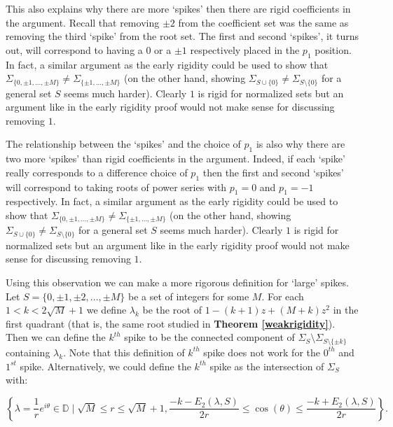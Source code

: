 \documentclass[11pt]{amsart}
\numberwithin{theorem}{section} %
\numberwithin{corollary}{section}
\numberwithin{lemma}{section}
\numberwithin{proposition}{section}
\numberwithin{definition}{section}
\begin{document}
This also explains why there are more `spikes' then there are rigid coefficients in the argument. Recall that removing $\pm 2$ from the coefficient set was the same as removing the third `spike' from the root set. The first and second `spikes', it turns out, will correspond to having a $0$ or a $\pm 1$ respectively placed in the $p_1$ position. In fact, a similar argument as the early rigidity could be used to show that $\Sigma_{ \{ 0, \pm 1, ..., \pm M \} } \neq \Sigma_{ \{ \pm1, ..., \pm M \}}$ (on the other hand, showing $\Sigma_{S \cup \{ 0 \}} \neq \Sigma_{S \setminus \{ 0 \}}$ for a general set $S$ seems much harder). Clearly $1$ is rigid for normalized sets but an argument like in the early rigidity proof would not make sense for discussing removing $1$.

The relationship between the `spikes' and the choice of $p_1$ is also why there are two more `spikes' than rigid coefficients in the argument. Indeed, if each `spike' really corresponds to a difference choice of $p_1$ then the first and second `spikes' will correspond to taking roots of power series with $p_1 = 0$ and $p_1 = -1$ respectively. In fact, a similar argument as the early rigidity could be used to show that $\Sigma_{ \{ 0, \pm 1, ..., \pm M \} } \neq \Sigma_{ \{ \pm1, ..., \pm M \}}$ (on the other hand, showing $\Sigma_{S \cup \{ 0 \}} \neq \Sigma_{S \setminus \{ 0 \}}$ for a general set $S$ seems much harder). Clearly $1$ is rigid for normalized sets but an argument like in the early rigidity proof would not make sense for discussing removing $1$.




Using this observation we can make a more rigorous definition for `large' spikes. Let $S = \{0, \pm 1, \pm 2, ..., \pm M \}$ be a set of integers for some $M$. For each $1 < k < 2\sqrt{M}+1$ we define $\lambda_k$ be the root of $1 - (k+1)z + (M+k)z^2$ in the first quadrant (that is, the same root studied in \textbf{Theorem \ref{weakrigidity}}). Then we can define the $k^{th}$ spike to be the connected component of $\Sigma_S \setminus \Sigma_{S \setminus \{ \pm k \} }$ containing $\lambda_k$. Note that this definition of $k^{th}$ spike does not work for the $0^{th}$ and $1^{st}$ spike. Alternatively, we could define the $k^{th}$ spike as the intersection of $\Sigma_S$ with:

\[ 
\left \{ \lambda = \frac{1}{r}e^{i\theta} \in \mathbb{D} \mid \sqrt{M} \leqslant r \leqslant \sqrt{M}+1, \frac{-k - E_2(\lambda, S)}{2r} \leqslant \cos(\theta) \leqslant \frac{-k+E_2(\lambda, S)}{2r} \right \}.
\]
\end{document}
